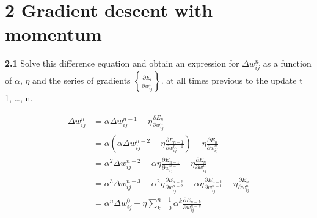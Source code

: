 \documentclass[a4paper, 12pt]{article}
\begin{document}
\section*{2 Gradient descent with momentum}

\textcolor{myblue}{
\textbf{2.1} {Solve this difference equation and obtain an expression for $\Delta w_{ij}^{n}$ 
as a function of $\alpha$, $\eta$ and the series of gradients
 $\left\{ \frac{\partial E_{t}}{\partial w_{ij}^{t}} \right\} $.
at all times previous to the update t = 1, \dots,  n.
    }
}

\begin{align*}
    \Delta w_{ij}^{n} &= \alpha \Delta w_{ij}^{n-1} - \eta \frac{\partial E_{n}}{\partial w_{ij}^{n}} \\
    &= \alpha \left( \alpha \Delta w_{ij}^{n-2} - \eta \frac{\partial E_{n-1}}{\partial w_{ij}^{n-1}} \right) - \eta \frac{\partial E_{n}}{\partial w_{ij}^{n}} \\
    &= \alpha^2 \Delta w_{ij}^{n-2} - \alpha \eta \frac{\partial E_{n-1}}{\partial w_{ij}^{n-1}} - \eta \frac{\partial E_{n}}{\partial w_{ij}^{n}} \\
    &= \alpha^3 \Delta w_{ij}^{n-3} - \alpha^2 \eta \frac{\partial E_{n-2}}{\partial w_{ij}^{n-2}} - \alpha \eta \frac{\partial E_{n-1}}{\partial w_{ij}^{n-1}} - \eta \frac{\partial E_{n}}{\partial w_{ij}^{n}} \\
    &= \alpha^n \Delta w_{ij}^{0} - \eta \sum_{k=0}^{n-1} \alpha^{k} \frac{\partial E_{n-k}}{\partial w_{ij}^{n-k}} \\
\end{align*}
\end{document}
